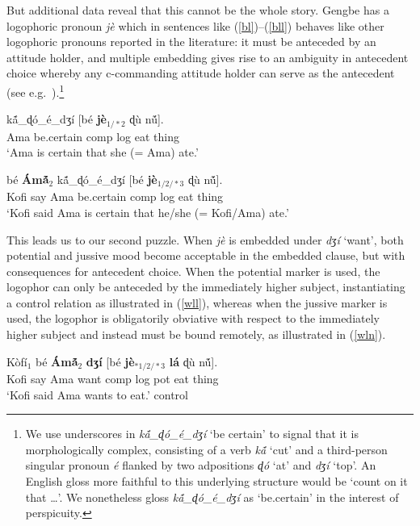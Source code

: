 \documentclass[output=paper
,modfonts
,nonflat]{langsci/langscibook}
\newcommand{\Z}{ʒ}
\newcommand{\D}{ɖ}
\newcommand{\á}{\'{ã}}
\newcommand{\É}{\'{\~{ε}}}
\newcommand{\È}{\`{\~{ε}}}
\newcommand{\í}{\'{\~{i}}}
\newcommand{\ì}{\`{\~{i}}}
\newcommand{\Ó}{\'{\~{ɔ}}}
\newcommand{\Ò}{\`{\~{ɔ}}}
\newcommand{\ú}{\'{ũ}}
\newcommand{\ù}{\`{ũ}}
\begin{document}
But additional data reveal that this cannot be the whole story. Gengbe has a logophoric pronoun {\em  j\`e} which in sentences like (\ref{bl})--(\ref{bll}) behaves like other logophoric pronouns reported in the literature: it must be anteceded by an attitude holder, and multiple embedding gives rise to an ambiguity in antecedent choice whereby any c-commanding attitude holder can serve as the antecedent (see e.g.~\citealt{clements75, pearson15}).\footnote{We use underscores in {\em k\'{\~a}\_{\D}\'o\_\'e\_d{\Z}\'i} `be certain' to signal that it is morphologically complex, consisting of a verb {\em k\'{\~a}} `cut' and a third-person singular pronoun  {\em \'e} flanked by two adpositions {\em {\D}\'o} `at' and {\em d{\Z}\'i} `top'. An English gloss more faithful to this underlying structure would be `count on it that
\ldots'.  We nonetheless gloss  {\em k\'{\~a}\_{\D}\'o\_\'e\_d{\Z}\'i}  as `be.certain' in the interest of perspicuity. }

\ea
{} k\'{\~a}\_{\D}\'o\_\'e\_d{\Z}\'i [b\'e {\bf j\`e$_{1/*2}$}  {\D}\`u n\'{\~u}].\\
Ama be.certain {\sc comp} {\sc log}  eat thing\\
\glt `Ama is certain that she (= Ama)  ate.' \label{bl}
\z

\ea 
{} b\'e {\bf \'Am\'{\~a}$_{2}$} k\'{\~a}\_{\D}\'o\_\'e\_d{\Z}\'i [b\'e {\bf j\`e$_{1/2/*3}$}  {\D}\`u n\'{\~u}].\\
Kofi say Ama be.certain {\sc comp} {\sc log}  eat thing\\
\glt `Kofi said Ama is certain that he/she (= Kofi/Ama)  ate.' \label{bll}
\z

This leads us to our second puzzle. When {\em  j\`e} is embedded under  {\em d{\Z}\'i} `want', both potential and jussive mood become acceptable in the embedded clause, but with consequences for antecedent choice. When the potential marker is used, the logophor can only be anteceded by the immediately higher subject, instantiating a control relation as illustrated in (\ref{wll}), whereas when the jussive marker is used, the logophor is obligatorily obviative with respect to the immediately higher subject and instead must be bound remotely, as illustrated in (\ref{wln}).

\ea
\gll K\`of\'i$_{1}$ b\'e {\bf \'Am\'{\~a}$_{2}$} {\bf d{\Z}\'i} [b\'e {\bf j\`e$_{*1/2/*3}$} {\bf l\'a} {\D}\`u n\'{\~u}].\\
Kofi say Ama want {\sc comp} {\sc log} {\sc pot} eat thing\\
\glt `Kofi said Ama wants to eat.' \label{wll}  \hfill {\sc control}%
\z
\end{document}
